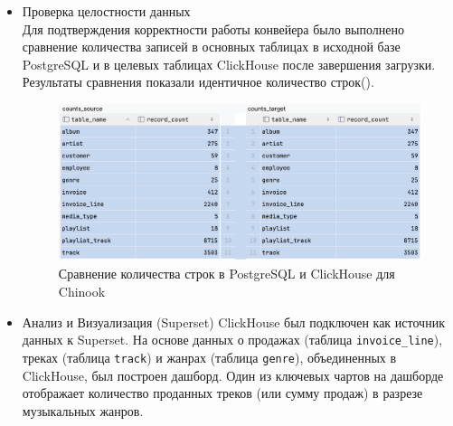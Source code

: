 \begin{enumerate}[1.]
\begin{itemize}
              \item Проверка целостности данных \\
                    Для подтверждения корректности работы конвейера было выполнено сравнение количества записей в основных таблицах в исходной базе PostgreSQL и в целевых таблицах ClickHouse после завершения загрузки. Результаты сравнения показали идентичное количество строк().
                    \begin{figure}[h]
                        \center
                        \includegraphics [scale=0.5] {my_folder/images/ex2_counts_comparering}
                        \caption{Сравнение количества строк в PostgreSQL и ClickHouse для Chinook}
                        \label{fig:ex2_counts_comparering}
                    \end{figure}
                    \FloatBarrier
              \item Анализ и Визуализация (Superset)
                    ClickHouse был подключен как источник данных к Superset. На основе данных о продажах (таблица \texttt{invoice\_line}), треках (таблица \texttt{track}) и жанрах (таблица \texttt{genre}), объединенных в ClickHouse, был построен дашборд. Один из ключевых чартов на дашборде отображает количество проданных треков (или сумму продаж) в разрезе музыкальных жанров.
                    \begin{figure}[h]
                        \center

\end{figure}
\end{itemize}
\end{enumerate}
